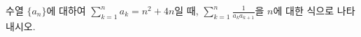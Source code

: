 수열 $\{a_n\}$에 대하여 $\displaystyle\sum_{k=1}^{n}a_k=n^2+4n$일 때, $\displaystyle\sum_{k=1}^{n}\frac{1}{a_ka_{k+1}}$을 $n$에 대한 식으로 나타내시오.
